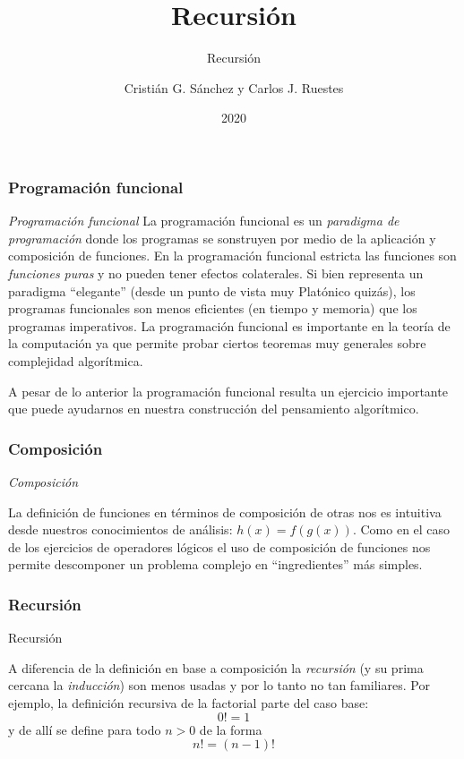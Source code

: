 \documentclass{beamer}
\title{Recursión}
\subtitle{Recursión}
\author{Cristián G. Sánchez y Carlos J. Ruestes}
\date{2020}
\begin{document}
\frame{\titlepage}

\begin{frame}[fragile]
    \frametitle{Programación funcional}
    \begin{block}{{\em Programación funcional}}
        La programación funcional es un {\em paradigma de programación} donde los programas se sonstruyen por medio de la
        aplicación y composición de funciones. En la programación funcional estricta las funciones son {\em funciones puras} 
        y no pueden tener efectos colaterales. Si bien representa un paradigma ``elegante'' (desde un punto de vista muy Platónico quizás),
        los programas funcionales son menos eficientes (en tiempo y memoria) que los programas imperativos. La programación funcional es importante
        en la teoría de la computación ya que permite probar ciertos teoremas muy generales sobre complejidad algorítmica.
    \end{block}    
    A pesar de lo anterior la programación funcional resulta un ejercicio importante que puede ayudarnos en nuestra construcción del pensamiento algorítmico.
\end{frame}

\begin{frame}[fragile]
    \frametitle{Composición}
    \begin{block}{{\em Composición}}

    La definición de funciones en términos de composición de otras nos es intuitiva desde nuestros conocimientos de análisis: $h(x) =f(g(x))$.
    Como en el caso de los ejercicios de operadores lógicos el uso de composición de funciones nos permite descomponer un problema complejo
    en ``ingredientes'' más simples.
    \end{block}
\end{frame}

\begin{frame}[fragile]
    \frametitle{Recursión}
    \begin{block}{Recursión}

    A diferencia de la definición en base a composición la {\em recursión} (y su prima cercana la {\em inducción}) son menos usadas y por lo tanto
    no tan familiares. Por ejemplo, la definición recursiva de la factorial parte del \alert{caso base}:
    $$0!=1$$
    y de allí se define para todo $n>0$ de la forma
    $$n! = (n-1)!$$
\end{block}
\end{frame}
\end{document}
